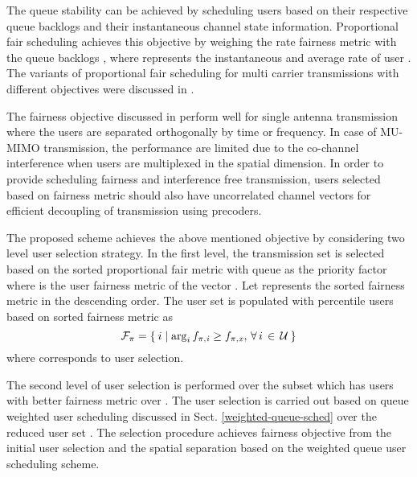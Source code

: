 
The queue stability can be achieved by scheduling users based on their respective queue backlogs and their instantaneous channel state information. Proportional fair scheduling achieves this objective by weighing the rate fairness metric  with the queue backlogs , where  represents the instantaneous and average rate of user . The variants of proportional fair scheduling for multi carrier transmissions with different objectives were discussed in \cite{adaptation_crosslayer}.

The fairness objective discussed in \cite{adaptation_crosslayer} perform well for single antenna transmission where the users are separated orthogonally by time or frequency. In case of MU-MIMO transmission, the performance are limited due to the co-channel interference when users are multiplexed in the spatial dimension. In order to provide scheduling fairness and interference free transmission, users selected based on fairness metric should also have uncorrelated channel vectors for efficient decoupling of transmission using precoders.

The proposed scheme achieves the above mentioned objective by considering two level user selection strategy. In the first level, the transmission set  is selected based on the sorted proportional fair metric with queue as the priority factor  where  is the  user fairness metric of the vector . Let  represents the sorted fairness metric in the descending order. The user set  is populated with  percentile users based on sorted fairness metric  as
\begin{equation}
\mathcal{F}_\pi = \left \lbrace \: i \mid \arg_i {f}_{\mathit{\pi},\mathit{i}} \geq {f}_{\mathit{\pi},\mathit{x}}, \, \forall \, i \, \in \, \mathcal{U} \: \right \rbrace
\end{equation}
where  corresponds to  user selection.

The second level of user selection is performed over the subset  which has users with better fairness metric over . The user selection is carried out based on queue weighted user scheduling discussed in Sect. \ref{weighted-queue-sched} over the reduced user set . The selection procedure achieves fairness objective from the initial user selection and the spatial separation based on the weighted queue user scheduling scheme. 
